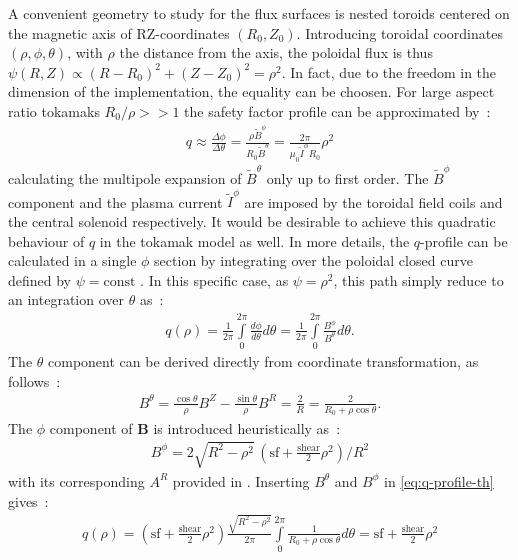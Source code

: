 A convenient geometry to study for the flux surfaces is nested toroids centered on the magnetic axis of RZ-coordinates $(R_0, Z_0)$. Introducing toroidal coordinates $(\rho, \phi, \theta)$, with $\rho$ the distance from the axis, the poloidal flux is thus $\psi(R, Z) \propto (R - R_0)^2 + (Z - Z_0)^2 = \rho^2$. In fact, due to the freedom in the dimension of the implementation, the equality can be choosen. For large aspect ratio tokamaks $R_0/\rho >> 1$ the safety factor profile can be approximated by~:
\begin{align*}
    q \approx \frac{\Delta\phi}{\Delta\theta} = \frac{\rho \tilde{B}^\phi}{R_0 \tilde{B}^\theta} = \frac{2\pi}{\mu_0\tilde{I}^\phi R_0} \rho^2
\end{align*}
calculating the multipole expansion of $\tilde{B}^\theta$ only up to first order. The $\tilde{B}^\phi$ component and the plasma current $\tilde{I}^\phi$ are imposed by the toroidal field coils and the central solenoid respectively. It would be desirable to achieve this quadratic behaviour of $q$ in the tokamak model as well. In more details, the $q$-profile can be calculated in a single $\phi$ section by integrating over the poloidal closed curve defined by $\psi = \text{const}$ \cite[pp.111-112]{wesson_tokamaks_2011}. In this specific case, as $\psi = \rho^2$, this path simply reduce to an integration over $\theta$ as~:
\begin{align}\label{eq:q-profile-th}
    q(\rho) = \frac{1}{2\pi}\int\limits_0^{2\pi} \frac{d\phi}{d\theta}d\theta = \frac{1}{2\pi}\int\limits_0^{2\pi} \frac{B^\phi}{B^\theta}d\theta.
\end{align}
The $\theta$ component can be derived directly from coordinate transformation, as follows~:
\begin{align*}
    B^\theta = \frac{\cos{\theta}}{\rho}B^Z - \frac{\sin{\theta}}{\rho}B^R = \frac{2}{R} = \frac{2}{R_0+\rho\cos{\theta}}.
\end{align*}
The $\phi$ component of $\textbf{B}$ is introduced heuristically as~:
\begin{align*}
    B^\phi = 2\sqrt{R^2-\rho^2}\,(\text{sf}+\frac{\text{shear}}{2}\rho^2)/R^2
\end{align*}
with its corresponding $A^R$ provided in . Inserting $B^\theta$ and $B^\phi$ in \eqref{eq:q-profile-th} gives~:
\begin{align*}
     q(\rho) = (\text{sf}+\frac{\text{shear}}{2}\rho^2)\frac{\sqrt{R^2-\rho^2}}{2\pi}\int\limits_{0}^{2\pi}\frac{1}{R_0 + \rho\cos{\theta}}d\theta = \text{sf}+\frac{\text{shear}}{2}\rho^2
\end{align*}
